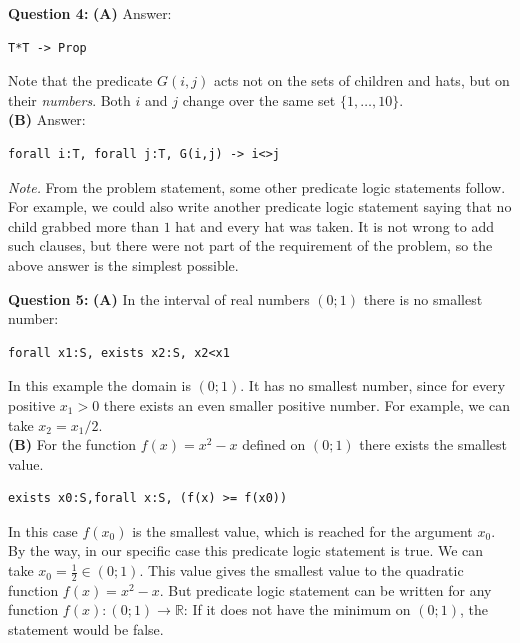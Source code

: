 \documentclass[jou]{apa6}
\begin{document}
\vspace{10pt}
{\bf Question 4:} {\bf (A)} Answer:
\begin{verbatim}
T*T -> Prop
\end{verbatim}
Note that the predicate $G(i,j)$ acts not on the sets of children and hats, but 
on their {\em numbers}. Both $i$ and $j$ change over the same set $\{ 1,\ldots,10\}$.\\
{\bf (B)} Answer:
\begin{verbatim}
forall i:T, forall j:T, G(i,j) -> i<>j
\end{verbatim}

{\em Note.} From the problem statement, some other predicate logic statements follow.
For example, we could also write another predicate logic statement saying that no child 
grabbed more than $1$ hat and every hat was taken. It is not wrong to add such clauses, 
but there were not part of the requirement of the problem, so the above answer is the 
simplest possible.

\vspace{10pt}
{\bf Question 5:} 
{\bf (A)} In the interval of real numbers $(0;1)$ there is no smallest number:
\begin{verbatim}
forall x1:S, exists x2:S, x2<x1
\end{verbatim}
In this example the domain is $(0;1)$. It has no smallest number, since for every positive $x_1 > 0$
there exists an even smaller positive number. For example, we can take $x_2 = x_1/2$.\\
{\bf (B)} For the function $f(x) = x^2 - x$ defined on $(0;1)$ there exists the smallest value.
\begin{verbatim}
exists x0:S,forall x:S, (f(x) >= f(x0))
\end{verbatim}

In this case $f(x_0)$ is the smallest value, which is reached for the argument $x_0$. 
By the way, in our specific case this predicate logic statement is true. 
We can take $x_0 = \frac{1}{2} \in (0;1)$. This value gives the smallest value to 
the quadratic function $f(x) = x^2 - x$. But predicate logic statement can be written for 
any function $f(x): (0;1)\rightarrow \mathbb{R}$: 
If it does not have the minimum on $(0;1)$, the statement would be false.
\end{document}
